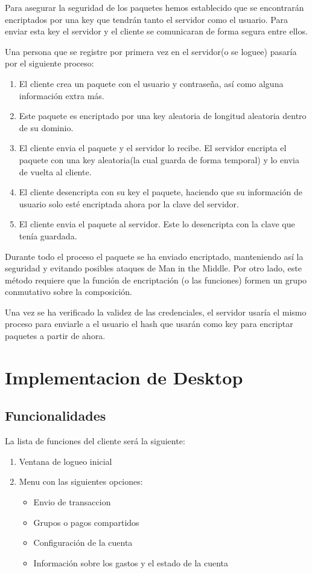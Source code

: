 \documentclass{article}
\theoremstyle{definition}
\begin{document}
Para asegurar la seguridad de los paquetes hemos establecido que se encontrarán encriptados por una key que tendrán tanto el servidor como el usuario. Para enviar esta key el servidor y el cliente se comunicaran de forma segura entre ellos. 

Una persona que se registre por primera vez en el servidor(o se loguee) pasaría por el siguiente proceso:

\begin{enumerate}
\item El cliente crea un paquete con el usuario y contraseña, así como alguna información extra más. \item Este paquete es encriptado por una key aleatoria de longitud aleatoria dentro de su dominio. 
\item El cliente envia el paquete y el servidor lo recibe. El servidor encripta el paquete con una key aleatoria(la cual guarda de forma temporal) y lo envia de vuelta al cliente.
\item El cliente desencripta con su key el paquete, haciendo que su información de usuario solo esté encriptada ahora por la clave del servidor.
\item El cliente envia el paquete al servidor. Este lo desencripta con la clave que tenía guardada.
\end{enumerate}

Durante todo el proceso el paquete se ha enviado encriptado, manteniendo así la seguridad y evitando posibles ataques de Man in the Middle. Por otro lado, este método requiere que la función de encriptación (o las funciones) formen un grupo conmutativo sobre la composición.

Una vez se ha verificado la validez de las credenciales, el servidor usaría el mismo proceso para enviarle a el usuario el hash que usarán como key para encriptar paquetes a partir de ahora.


\section{Implementacion de Desktop}


\subsection{Funcionalidades}

La lista de funciones del cliente será la siguiente:
\begin{enumerate}
\item Ventana de logueo inicial
\item Menu con las siguientes opciones:\begin{itemize}
\item Envio de transaccion
\item Grupos o pagos compartidos
\item Configuración de la cuenta
\item Información sobre los gastos y el estado de la cuenta
\end{itemize}
\end{enumerate}
\end{document}
